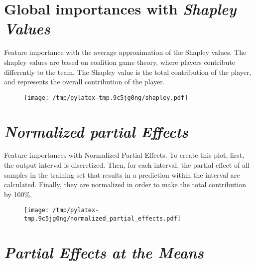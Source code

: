 \documentclass{article}%
\begin{document}
                \lfoot{}
                \cfoot{}
                \rfoot{\thepage\ | \pageref{LastPage}}
\section*{Global importances with \textit{Shapley Values}}%
\label{sec:GlobalimportanceswithtextitShapleyValues}%

                Feature importance with the average approximation of the 
                Shapley values. The shapley values are based on coalition game
                theory, where players contribute differently to the team. The
                Shapley value is the total contribution of the player, and
                represents the overall contribution of the player.
            
                \vfill%


\begin{figure}[H]%
\centering%
\texttt{[image: /tmp/pylatex-tmp.9c5jg0ng/shapley.pdf]}%
\end{figure}

%
\vfill \pagebreak

%
\section*{\textit{Normalized partial Effects}}%
\label{sec:textitNormalizedpartialEffects}%

                Feature importances with Normalized Partial Effects. 
                To create this plot, first, the output interval is discretized.
                Then, for each interval, the partial effect of all samples
                in the training set that results in a prediction within the
                interval are calculated. Finally, they are normalized in
                order to make the total contribution by 100\%.

                \vfill%


\begin{figure}[H]%
\centering%
\texttt{[image: /tmp/pylatex-tmp.9c5jg0ng/normalized\_partial\_effects.pdf]}%
\end{figure}

%
\vfill \pagebreak

%
\section*{\textit{Partial Effects at the Means}}%
\label{sec:textitPartialEffectsattheMeans}%
\end{document}
